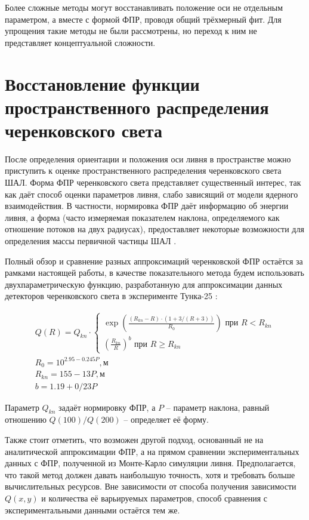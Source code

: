 Более сложные методы могут восстанавливать положение оси не отдельным параметром, а вместе с формой ФПР, проводя общий трёхмерный фит. Для упрощения такие методы не были рассмотрены, но переход к ним не представляет концептуальной сложности.

\section{Восстановление функции пространственного распределения черенковского света}

После определения ориентации и положения оси ливня в пространстве можно приступить к оценке пространственного распределения черенковского света ШАЛ. Форма ФПР черенковского света представляет существенный интерес, так как даёт способ оценки параметров ливня, слабо зависящий от модели ядерного взаимодействия. В частности, нормировка ФПР даёт информацию об энергии ливня, а форма (часто измеряемая показателем наклона, определяемого как отношение потоков на двух радиусах), предоставляет некоторые возможности для определения массы первичной частицы ШАЛ \cite{Patterson1983, Dawson1989, TOKUNO2008}.

Полный обзор и сравнение разных аппроксимаций черенковской ФПР остаётся за рамками настоящей работы, в качестве показательного метода будем использовать двухпараметрическую функцию, разработанную для аппроксимации данных детекторов черенковского света в эксперименте Тунка-25 \cite{Budnev2005}:

\begin{equation}
	\label{eq:tunka-25-ldf}
	\begin{gathered}
	Q(R) = Q_{kn} \cdot \begin{cases}
		\exp \left( \frac{(R_{kn} - R) \cdot (1 + 3/(R+3))}{R_0} \right) \text{ при } R < R_{kn} \\
		\left(\frac{R_{kn}}{R}\right)^b \text{ при } R \geq R_{kn} 
	\end{cases} \\
	R_0 = 10^{2.95 - 0.245 P}, \text{м}  \\
	R_{kn} = 155 - 13P, \text{м} \\
	b = 1.19 + 0/23 P
	\end{gathered}
\end{equation}

Параметр $Q_{kn}$ задаёт нормировку ФПР, а $P$ -- параметр наклона, равный отношению $Q(100)/Q(200)$ -- определяет её форму.

Также стоит отметить, что возможен другой подход, основанный не на аналитической аппроксимации ФПР, а на прямом сравнении экспериментальных данных с ФПР, полученной из Монте-Карло симуляции ливня. Предполагается, что такой метод должен давать наибольшую точность, хотя и требовать больше вычислительных ресурсов. Вне зависимости от способа получения зависимости $Q(x, y)$ и количества её варьируемых параметров, способ сравнения с экспериментальными данными остаётся тем же.

